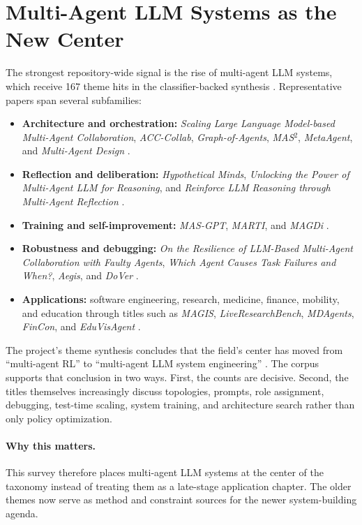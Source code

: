 \documentclass[11pt]{article}
\begin{document}
\section{Multi-Agent LLM Systems as the New Center}
The strongest repository-wide signal is the rise of multi-agent LLM systems, which receive 167 theme hits in the classifier-backed synthesis \cite{theme_synthesis}. Representative papers span several subfamilies:
\begin{itemize}[leftmargin=1.5em]
    \item \textbf{Architecture and orchestration:} \emph{Scaling Large Language Model-based Multi-Agent Collaboration}, \emph{ACC-Collab}, \emph{Graph-of-Agents}, \emph{MAS$^2$}, \emph{MetaAgent}, and \emph{Multi-Agent Design} \cite{iclr_subset,icml_list}.
    \item \textbf{Reflection and deliberation:} \emph{Hypothetical Minds}, \emph{Unlocking the Power of Multi-Agent LLM for Reasoning}, and \emph{Reinforce LLM Reasoning through Multi-Agent Reflection} \cite{iclr_subset,icml_list}.
    \item \textbf{Training and self-improvement:} \emph{MAS-GPT}, \emph{MARTI}, and \emph{MAGDi} \cite{icml_list,iclr_subset}.
    \item \textbf{Robustness and debugging:} \emph{On the Resilience of LLM-Based Multi-Agent Collaboration with Faulty Agents}, \emph{Which Agent Causes Task Failures and When?}, \emph{Aegis}, and \emph{DoVer} \cite{icml_list,iclr_subset}.
    \item \textbf{Applications:} software engineering, research, medicine, finance, mobility, and education through titles such as \emph{MAGIS}, \emph{LiveResearchBench}, \emph{MDAgents}, \emph{FinCon}, and \emph{EduVisAgent} \cite{neurips_list,iclr_subset}.
\end{itemize}

The project's theme synthesis concludes that the field's center has moved from ``multi-agent RL'' to ``multi-agent LLM system engineering'' \cite{theme_synthesis}. The corpus supports that conclusion in two ways. First, the counts are decisive. Second, the titles themselves increasingly discuss topologies, prompts, role assignment, debugging, test-time scaling, system training, and architecture search rather than only policy optimization.

\paragraph{Why this matters.}
This survey therefore places multi-agent LLM systems at the center of the taxonomy instead of treating them as a late-stage application chapter. The older themes now serve as method and constraint sources for the newer system-building agenda.
\end{document}
